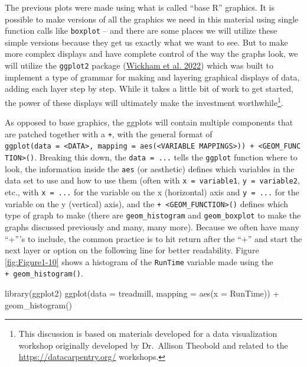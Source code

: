 \documentclass[
]{book}
\newenvironment{Shaded}{\begin{snugshade}}{\end{snugshade}}
\newcommand{\AttributeTok}[1]{\textcolor[rgb]{0.77,0.63,0.00}{#1}}
\newcommand{\FunctionTok}[1]{\textcolor[rgb]{0.00,0.00,0.00}{#1}}
\newcommand{\NormalTok}[1]{#1}
\newcommand{\SpecialCharTok}[1]{\textcolor[rgb]{0.00,0.00,0.00}{#1}}
\begin{document}
The previous plots were made using what is called ``base R'' graphics. It is
possible to make versions of all the graphics we need in this material using
single function calls like \texttt{boxplot} -- and there are some places we will
utilize these simple versions because they get us exactly what we want to see.
But to make more complex displays and have complete control of the way the
graphs look, we will utilize the \texttt{ggplot2} package (\protect\hyperlink{ref-R-ggplot2}{Wickham et al. 2022}) which was
built to implement a type of grammar for making and layering graphical displays
of data, adding each layer step by step. 
 While it takes a little bit of work to get
started, the power of these displays will ultimately make the investment
worthwhile\footnote{This discussion is based on materials developed for a data
  visualization workshop originally developed by Dr.~Allison Theobold and related
  to the \url{https://datacarpentry.org/} workshops.}.

\indent As opposed to base graphics, the ggplots will contain multiple components
that are patched together with a \texttt{+}, with the general format of
\texttt{ggplot(data\ =\ \textless{}DATA\textgreater{},\ mapping\ =\ aes(\textless{}VARIABLE\ MAPPINGS\textgreater{}))\ +\ \textless{}GEOM\_FUNCTION\textgreater{}()}.
Breaking this down, the \texttt{data\ =\ ...} tells the \texttt{ggplot} function where to look,
the information inside the \texttt{aes} (or aesthetic) defines which variables in the
data set to use and how to use them (often with \texttt{x\ =\ variable1},
\texttt{y\ =\ variable2}, etc., with \texttt{x\ =\ ...} for the variable on the x (horizontal)
axis and \texttt{y\ =\ ...} for the variable on the y (vertical) axis), and the
\texttt{+\ \textless{}GEOM\_FUNCTION\textgreater{}()} defines which type of graph to make (there are
\texttt{geom\_histogram} and \texttt{geom\_boxplot} to make the graphs discussed previously and
many, many more). Because we often have many ``+'''s to include, the common
practice is to hit return after the ``+'' and start the next layer or option on
the following line for better readability. Figure \ref{fig:Figure1-10} shows a
histogram of the \texttt{RunTime} variable made using the \texttt{+\ geom\_histogram()}.
 



\begin{Shaded}
\begin{Highlighting}[]
\FunctionTok{library}\NormalTok{(ggplot2)}
\FunctionTok{ggplot}\NormalTok{(}\AttributeTok{data =}\NormalTok{ treadmill, }\AttributeTok{mapping =} \FunctionTok{aes}\NormalTok{(}\AttributeTok{x =}\NormalTok{ RunTime)) }\SpecialCharTok{+} \FunctionTok{geom\_histogram}\NormalTok{()}
\end{Highlighting}
\end{Shaded}
\end{document}

